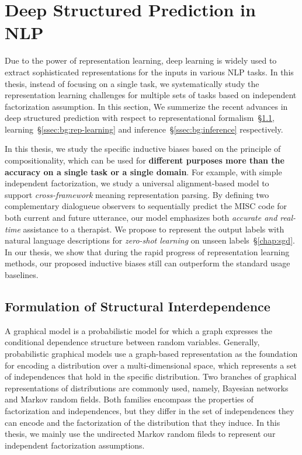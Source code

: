 \section{Deep Structured Prediction in NLP}
\label{sec:background:deepsp}
Due to the power of representation learning, deep learning is widely
used to extract sophisticated representations for the inputs in
various NLP tasks. In this thesis, instead of focusing on a single
task, we systematically study the representation learning challenges
for multiple sets of tasks based on independent factorization
assumption.  In this section, We summerize the recent advances in deep
structured prediction with respect to representational
formalism~\S\ref{ssec:bg:formalism},
learning~\S\ref{ssec:bg:rep-learning} and
inference~\S\ref{ssec:bg:inference} respectively.

In this thesis, we study the specific inductive biases based on the
principle of compositionality, which can be used for \textbf{different
  purposes more than the accuracy on a single task or a single
  domain}. For example, with simple independent factorization, we
study a universal alignment-based model to support
\textit{cross-framework} meaning representation parsing. By defining
two complementary dialogueue observers to sequentially predict the
MISC code for both current and future utterance, our model emphasizes
both \textit{accurate and real-time} assistance to a therapist. We
propose to represent the output labels with natural language
descriptions for \textit{zero-shot learning} on unseen
labels~\S\ref{chap:sgd}. In our thesis, we show that during the
rapid progress of representation learning methods, our proposed
inductive biases still can outperform the standard usage baselines.

\subsection{Formulation of Structural Interdependence}
\label{ssec:bg:formalism}

 A graphical model is a probabilistic
model for which a graph expresses the conditional dependence structure
between random variables. Generally, probabilistic graphical models
use a graph-based representation as the foundation for encoding a
distribution over a multi-dimensional space, which represents a set of
independences that hold in the specific distribution. Two branches of
graphical representations of distributions are commonly used, namely,
Bayesian networks and Markov random fields. Both families encompass
the properties of factorization and independences, but they differ in
the set of independences they can encode and the factorization of the
distribution that they induce.  In this thesis, we mainly use the
undirected Markov random fileds to represent our independent
factorization assumptions.


